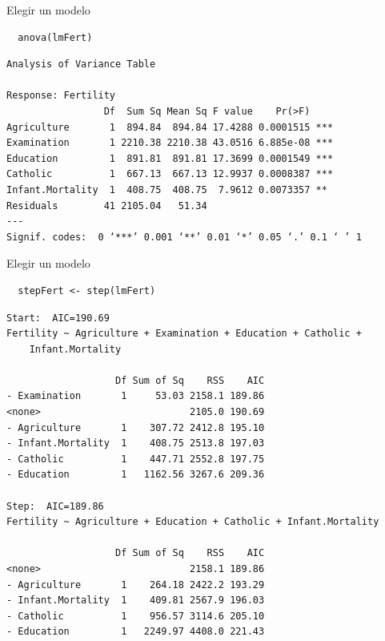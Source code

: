 \documentclass[xcolor={usenames,svgnames,dvipsnames}]{beamer}
\begin{document}
\begin{frame}[fragile,label=sec-3-10]{Elegir un modelo}
 \lstset{language=R,label= ,caption= ,numbers=none}
\begin{lstlisting}
  anova(lmFert)
\end{lstlisting}

\begin{verbatim}
Analysis of Variance Table

Response: Fertility
                 Df  Sum Sq Mean Sq F value    Pr(>F)    
Agriculture       1  894.84  894.84 17.4288 0.0001515 ***
Examination       1 2210.38 2210.38 43.0516 6.885e-08 ***
Education         1  891.81  891.81 17.3699 0.0001549 ***
Catholic          1  667.13  667.13 12.9937 0.0008387 ***
Infant.Mortality  1  408.75  408.75  7.9612 0.0073357 ** 
Residuals        41 2105.04   51.34                      
---
Signif. codes:  0 ‘***’ 0.001 ‘**’ 0.01 ‘*’ 0.05 ‘.’ 0.1 ‘ ’ 1
\end{verbatim}
\end{frame}

\begin{frame}[fragile,label=sec-3-11]{Elegir un modelo}
 \lstset{language=R,label= ,caption= ,numbers=none}
\begin{lstlisting}
  stepFert <- step(lmFert)
\end{lstlisting}

\begin{verbatim}
Start:  AIC=190.69
Fertility ~ Agriculture + Examination + Education + Catholic + 
    Infant.Mortality

                   Df Sum of Sq    RSS    AIC
- Examination       1     53.03 2158.1 189.86
<none>                          2105.0 190.69
- Agriculture       1    307.72 2412.8 195.10
- Infant.Mortality  1    408.75 2513.8 197.03
- Catholic          1    447.71 2552.8 197.75
- Education         1   1162.56 3267.6 209.36

Step:  AIC=189.86
Fertility ~ Agriculture + Education + Catholic + Infant.Mortality

                   Df Sum of Sq    RSS    AIC
<none>                          2158.1 189.86
- Agriculture       1    264.18 2422.2 193.29
- Infant.Mortality  1    409.81 2567.9 196.03
- Catholic          1    956.57 3114.6 205.10
- Education         1   2249.97 4408.0 221.43
\end{verbatim}
\end{frame}
\end{document}
